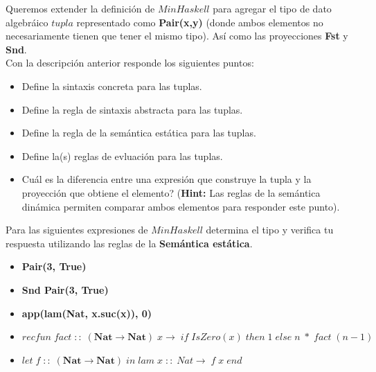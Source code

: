     \begin{exercise}
        Queremos extender la definición de $MinHaskell$ para agregar el tipo de dato algebráico $tupla$ representado como \textbf{Pair(x,y)} (donde ambos elementos no necesariamente tienen que tener el mismo tipo). Así como las proyecciones \textbf{Fst} y \textbf{Snd}.\\

        Con  la descripción anterior responde los siguientes puntos:
        \begin{itemize}
            \item Define la sintaxis concreta para las tuplas.
            \item Define la regla de sintaxis abstracta para las tuplas.
            \item Define la regla de la semántica estática para las tuplas.
            \item Define la(s) reglas de evluación para las tuplas.
            \item Cuál es la diferencia entre una expresión que construye la tupla y la proyección que obtiene el elemento? (\textbf{Hint: } Las reglas de la semántica dinámica permiten comparar ambos elementos para responder este punto).
        \end{itemize}
    \end{exercise}

    \bigskip

    \begin{exercise}
        Para las siguientes expresiones de $MinHaskell$ determina el tipo y verifica tu respuesta utilizando las reglas de la \textbf{Semántica estática}.\\
        
        \begin{itemize}
            \item \textbf{Pair(3, True)}
            \item \textbf{Snd Pair(3, True)}
            \item \textbf{app(lam(Nat, x.suc(x)), 0)}  
            \item  \textbf{$recfun\; fact\; ::\; (\textbf{Nat} \rightarrow \textbf{Nat})\; x \rightarrow\; if\; IsZero(x)\; then\; 1\; else\; n\; *\; fact\; (n-1)$}
            \item  \textbf{$ let\; f\; ::\; (\textbf{Nat} \rightarrow \textbf{Nat})\; in\; lam\; x\; ::\; Nat \rightarrow\; f\; x\; end$}
        \end{itemize}
    \end{exercise}

